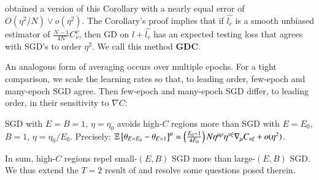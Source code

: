             \noindent
            \cite{ro19} obtained a version of this Corollary with a nearly
            equal error of $O(\eta^2/N)\vee o(\eta^2)$.  The Corollary's proof
            implies that if $\hat{l_c}$ is a
            smooth unbiased estimator of $\frac{N-1}{4 N}
            C^{\nu}_{\nu}$, then GD on $l + \hat{l_c}$ has an expected testing
            loss that agrees with SGD's to order $\eta^2$.  We call this method
            \textbf{GDC}.

            An analogous form of averaging occurs over multiple epochs.  
            For a
            tight comparison, we scale the learning rates %
            so
            that, to leading order, few-epoch and many-epoch SGD agree.  Then
            few-epoch and many-epoch SGD differ, to leading order, in their
            sensitivity to $\nabla C$:
            \begin{cor}[$\sdia{c(01-2)(01-12)}$] \label{cor:epochs}
                SGD with $E=B=1$, $\eta=\eta_0$ avoids high-$C$ regions more
                than SGD with $E=E_0$, $B=1$, $\eta=\eta_0/E_0$.  Precisely:
                $
                    \mathbb{E}\left[\theta_{E=E_0} - \theta_{E=1}\right]^\mu
                        =
                    \left(\frac{E_0-1}{4 E_0}\right) N
                    \eta^{\mu\rho} \eta^{\nu\xi} \nabla_\mu C_{\nu\xi}
                    + o(\eta^2)
                $.
            \end{cor}

            In sum, high-$C$ regions repel small-$(E,B)$ SGD more than
            large-$(E,B)$ SGD.  We thus extend the $T=2$ result of \cite{ro18}
            and resolve some questions posed therein.    
 
